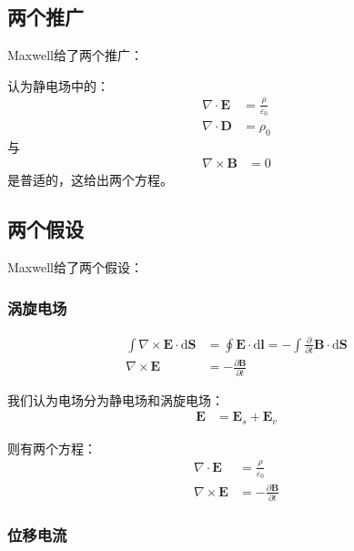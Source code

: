 \documentclass[12pt,onecolumn,a4paper]{book}
\numberwithin{table}{subsection}
\numberwithin{equation}{subsection}
\begin{document}
    \subsection{两个推广}
    Maxwell给了两个推广：

    认为静电场中的：
    \begin{align}
        \nabla \cdot \mathbf{E} & = \frac{\rho}{\varepsilon_0} \\
        \nabla \cdot \mathbf{D} & = \rho_0
    \end{align}
    与
    \begin{align}
        \nabla \times \mathbf{B} & = 0
    \end{align}
    是普适的，这给出两个方程。

    \subsection{两个假设}
    Maxwell给了两个假设：

    \subsubsection{涡旋电场}

    \begin{align}
        \int \nabla \times \mathbf{E} \cdot \mathrm{d} \mathbf{S} & = \oint \mathbf{E} \cdot \mathrm{d} \mathbf{l} = - \int \frac{\partial}{\partial t}  \mathbf{B} \cdot \mathrm{d} \mathbf{S} \\
        \nabla \times \mathbf{E}                                  & = - \frac{\partial \mathbf{B}}{\partial t}
    \end{align}

    我们认为电场分为静电场和涡旋电场：
    \begin{align}
        \mathbf{E} & = \mathbf{E}_s + \mathbf{E}_v
    \end{align}

    则有两个方程：
    \begin{align}
        \nabla \cdot \mathbf{E}  & = \frac{\rho}{\varepsilon_0}               \\
        \nabla \times \mathbf{E} & = - \frac{\partial \mathbf{B}}{\partial t}
    \end{align}

    \subsubsection{位移电流}
\end{document}
